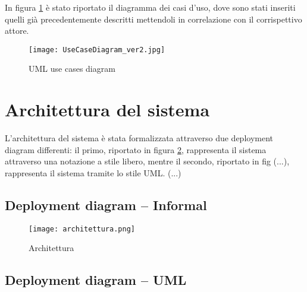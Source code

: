 In figura \ref{fig-uml-use-cases} è stato riportato il diagramma dei casi d'uso, dove sono stati inseriti quelli
già precedentemente descritti mettendoli in correlazione con il corrispettivo attore.

\begin{figure}[H]
      \centering
      \texttt{[image: UseCaseDiagram\_ver2.jpg]}
      \caption{UML use cases diagram}
      \label{fig-uml-use-cases}
\end{figure}


\newpage
\section{Architettura del sistema}
L'architettura del sistema è stata formalizzata attraverso due deployment diagram differenti: 
il primo, riportato in figura \ref{architettura}, rappresenta il sistema
attraverso una notazione a stile libero, mentre il secondo, riportato in fig (...), rappresenta
il sistema tramite lo stile UML. (...)

\subsection{Deployment diagram -- Informal}
\begin{figure}[H]
      \centering
      \texttt{[image: architettura.png]}
      \caption{Architettura}
      \label{architettura}
\end{figure}



\subsection{Deployment diagram -- UML}
\begin{figure}[H]
\end{figure}



